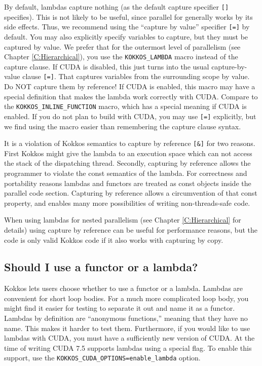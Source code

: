 By default, lambdas capture nothing (as the default capture specifier \lstinline![]! specifies).
This is not likely to be useful, since parallel for generally works by its side effects.
Thus, we recommend using the ``capture by value'' specifier \lstinline![=]! by default.
You may also explicitly specify variables to capture, but they must be captured by value.
We prefer that for the outermost level of parallelism (see Chapter \ref{C:Hierarchical}),
you use the \lstinline!KOKKOS_LAMBDA! macro instead of the capture clause.
If CUDA is disabled, this just turns into the usual capture-by-value clause \lstinline![=]!.
That captures variables from the surrounding scope by value.
Do NOT capture them by reference!
If CUDA is enabled, this macro may have a special definition 
that makes the lambda work correctly with CUDA.
Compare to the \lstinline!KOKKOS_INLINE_FUNCTION! macro,
which has a special meaning if CUDA is enabled.
If you do not plan to build with CUDA, you may use \lstinline![=]! explicitly,
but we find using the macro easier than remembering the capture clause syntax.

It is a violation of Kokkos semantics to capture by reference \lstinline|[&]| for two reasons.
First Kokkos might give the lambda to an execution space which can not access the stack of 
the dispatching thread. Secondly, capturing by reference allows the programmer to violate the 
const semantics of the lambda. For correctness and portability reasons lambdas and functors are
treated as const objects inside the parallel code section. Capturing by reference allows a circumvention
of that const property, and enables many more possibilities of writing non-threads-safe code.

When using lambdas for nested parallelism (see Chapter \ref{C:Hierarchical} for details) using
capture by reference can be useful for performance reasons, but the code is only valid Kokkos
code if it also works with capturing by copy.

\subsection{Should I use a functor or a lambda?}

Kokkos lets users choose whether to use a functor or a lambda.
Lambdas are convenient for short loop bodies.
For a much more complicated loop body,
you might find it easier for testing to separate it out and name it as a functor.
Lambdas by definition are ``anonymous functions,'' meaning that they have no name.
This makes it harder to test them.
Furthermore, if you would like to use lambdas with CUDA,
you must have a sufficiently new version of CUDA. 
At the time of writing CUDA 7.5 supports lambdas using a special flag. 
To enable this support, use the \lstinline|KOKKOS_CUDA_OPTIONS=enable_lambda| option.

